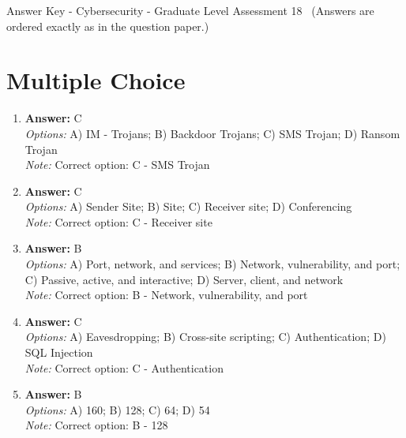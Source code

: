 \documentclass[12pt]{article}
\begin{document}
\begin{center}
Answer Key - Cybersecurity - Graduate Level Assessment 18 \
\small (Answers are ordered exactly as in the question paper.)
\end{center}

\section*{Multiple Choice}
\begin{enumerate}[label=\arabic*.]
\item \textbf{Answer:} C
\\ \textit{Options:} A) IM - Trojans; B) Backdoor Trojans; C) SMS Trojan; D) Ransom Trojan
\\ \textit{Note:} Correct option: C - SMS Trojan
\item \textbf{Answer:} C
\\ \textit{Options:} A) Sender Site; B) Site; C) Receiver site; D) Conferencing
\\ \textit{Note:} Correct option: C - Receiver site
\item \textbf{Answer:} B
\\ \textit{Options:} A) Port, network, and services; B) Network, vulnerability, and port; C) Passive, active, and interactive; D) Server, client, and network
\\ \textit{Note:} Correct option: B - Network, vulnerability, and port
\item \textbf{Answer:} C
\\ \textit{Options:} A) Eavesdropping; B) Cross-site scripting; C) Authentication; D) SQL Injection
\\ \textit{Note:} Correct option: C - Authentication
\item \textbf{Answer:} B
\\ \textit{Options:} A) 160; B) 128; C) 64; D) 54
\\ \textit{Note:} Correct option: B - 128
\end{enumerate}
\end{document}
